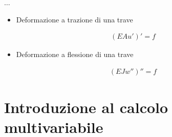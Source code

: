 \documentclass[letterpaper,10pt,english]{jupyterBook}
\begin{document}
\sphinxAtStartPar
\(\dots\)
\begin{itemize}
\item {} 
\sphinxAtStartPar
Deformazione a trazione di una trave

\end{itemize}
\begin{equation*}
\begin{split}(EA u')' = f\end{split}
\end{equation*}\begin{itemize}
\item {} 
\sphinxAtStartPar
Deformazione a flessione di una trave

\end{itemize}
\begin{equation*}
\begin{split}(EJ w'')'' = f\end{split}
\end{equation*}
\sphinxstepscope


\chapter{Introduzione al calcolo multi\sphinxhyphen{}variabile}
\label{\detokenize{ch/multivariable-calculus:introduzione-al-calcolo-multi-variabile}}\label{\detokenize{ch/multivariable-calculus:multivariable-calculus}}\label{\detokenize{ch/multivariable-calculus::doc}}
\sphinxstepscope
\end{document}
